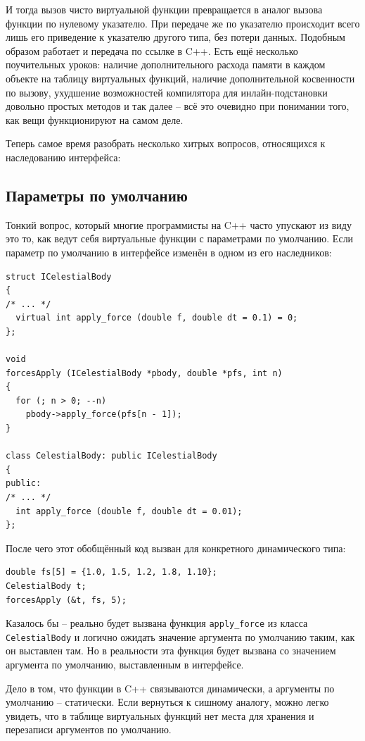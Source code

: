 \documentclass[a4paper,12pt,oneside]{book}
\begin{document}
И тогда вызов чисто виртуальной функции превращается в аналог вызова функции по нулевому указателю. При передаче же по указателю происходит всего лишь его приведение к указателю другого типа, без потери данных. Подобным образом работает и передача по ссылке в C++. Есть ещё несколько поучительных уроков: наличие дополнительного расхода памяти в каждом объекте на таблицу виртуальных функций, наличие дополнительной косвенности по вызову, ухудшение возможностей компилятора для инлайн-подстановки довольно простых методов и так далее -- всё это очевидно при понимании того, как вещи функционируют на самом деле.

Теперь самое время разобрать несколько хитрых вопросов, относящихся к наследованию интерфейса:

\subsection{Параметры по умолчанию}\label{DefArguments}

Тонкий вопрос, который многие программисты на C++ часто упускают из виду это то, как ведут себя виртуальные функции с параметрами по умолчанию. Если параметр по умолчанию в интерфейсе изменён в одном из его наследников:

\begin{lstlisting}
struct ICelestialBody
{
/* ... */
  virtual int apply_force (double f, double dt = 0.1) = 0;
};

void 
forcesApply (ICelestialBody *pbody, double *pfs, int n)
{
  for (; n > 0; --n)
    pbody->apply_force(pfs[n - 1]);
}

class CelestialBody: public ICelestialBody
{
public:
/* ... */
  int apply_force (double f, double dt = 0.01);
};
\end{lstlisting}

После чего этот обобщённый код вызван для конкретного динамического типа:

\begin{lstlisting}
double fs[5] = {1.0, 1.5, 1.2, 1.8, 1.10};
CelestialBody t;
forcesApply (&t, fs, 5);
\end{lstlisting}

Казалось бы -- реально будет вызвана функция \lstinline!apply_force! из класса \lstinline!CelestialBody! и логично ожидать значение аргумента по умолчанию таким, как он выставлен там. Но в реальности эта функция будет вызвана со значением аргумента по умолчанию, выставленным в интерфейсе.

Дело в том, что функции в C++ связываются динамически, а аргументы по умолчанию – статически. Если вернуться к сишному аналогу, можно легко увидеть, что в таблице виртуальных функций нет места для хранения и перезаписи аргументов по умолчанию.
\end{document}
